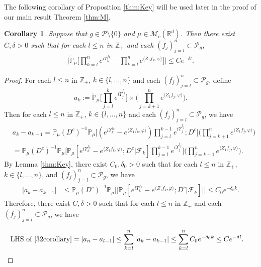 \documentclass[12pt,a4paper]{amsart}
\theoremstyle{plain}
\newtheorem{cor}[thm]{Corollary}
\theoremstyle{definition}
\numberwithin{equation}{section}
\begin{document}
The following corollary of Proposition \ref{thm:Key} will be used later in the proof of our main result Theorem \ref{thm:M}.
\begin{cor}
  \label{cor:MI}
  Suppose that $g\in \mathcal{P}\setminus\{0\}$ and $\mu\in \mathcal M_c(\mathbb R^d)$.
  Then there exist $C,\delta>0$ such that for each $l\leq n$ in $\mathbb Z_+$ and each $(f_j)_{j=l}^n\subset \mathcal P_g$,
\begin{align}
  \label{32corollary}
  \Big|\mathbb{\widetilde{P}}_{\mu}\Big[\prod_{k=l}^ne^{i \Upsilon^{f_k}_{k} }-\prod_{k=l}^n e^{\langle Z_1f_k, \varphi\rangle}\Big]\Big|\leq C e^{-\delta l}.
\end{align}
\end{cor}
\begin{proof}
  For each $l\leq n$ in $\mathbb Z_+$, $k \in \{l,\dots,n\}$ and each $(f_j)_{j=l}^n\subset \mathcal P_g$, define
  \[
    a_k
    :=  \mathbb{\widetilde{P}}_{\mu}\Big[\prod_{j=l}^{k} e^{i\Upsilon_j^{f_j}}\Big] \times \Big(\prod_{j=k+1}^{n} e^{ \langle Z_1f_j,\varphi \rangle} \Big).
  \]
  Then for each $l\leq n$ in $\mathbb Z_+$, $k \in \{l,\dots,n\}$ and each $(f_j)_{j=l}^n\subset \mathcal P_g$, we have
  \begin{align}
    & a_{k} - a_{k-1}
      =\mathbb{P}_{\mu}(D^c)^{-1} \mathbb{P}_{\mu}\Big[(e^{i\Upsilon^{f_k}_k}-e^{\langle Z_1f_k, \varphi\rangle})\prod_{j=l}^{k-1} e^{i\Upsilon_j^{f_j}};D^c\Big] \Big(\prod_{j=k+1}^n e^{\langle Z_1f_j, \varphi\rangle}\Big)\\
    & =\mathbb{P}_{\mu}(D^c)^{-1} \mathbb{P}_{\mu}\Big[\mathbb P_\mu[e^{i\Upsilon_k^{f_k}}-e^{\langle Z_1f_k, \varphi \rangle}; D^c|\mathscr F_k] \prod_{j=l}^{k-1} e^{i\Upsilon_j^{f_j}}\Big] \Big(\prod_{j=k+1}^{n}e^{\langle Z_1f_j, \varphi\rangle}\Big).
  \end{align}
  By Lemma \ref{thm:Key}, there exist $C_0,\delta_0 >0$ such that for each $l\leq n$ in $\mathbb Z_+$,  $k \in \{l,\dots , n\}$, and $(f_j)_{j=l}^n\subset \mathcal P_g$, we have
  \begin{align}
    | a_{k} - a_{k-1}|
    & \leq \mathbb{P}_{\mu}(D^c)^{-1}\mathbb{P}_{\mu}\Big[\big|\mathbb P_\mu[e^{i\Upsilon_k^{f_k}}-e^{\langle Z_1f_k, \varphi \rangle}; D^c | \mathscr{F}_k]\big|\Big]
    \leq C_0 e^{-\delta_0 k}.
  \end{align}
  Therefore, there exist $C,\delta >0$ such that for each $l\leq n$ in $\mathbb Z_+$ and each $(f_j)_{j=l}^n\subset \mathcal P_g$, we have

  \begin{align}
    \text{LHS of \eqref{32corollary}}
    & = \left|a_n-a_{l-1}\right|
      \leq \sum_{k=l}^n\left|a_{k}-a_{k-1}\right|
      \leq \sum_{k=l}^n C_0 e^{-\delta_0 k}
      \leq C e^{- \delta l}.
      \qedhere
  \end{align}
\end{proof}
\end{document}
